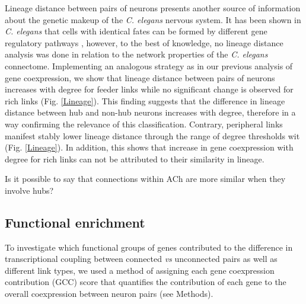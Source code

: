 \documentclass[10pt,letterpaper]{article}
\begin{document}
\begin{figure}[!h]
{%
}
 \label{fig:modules}
\end{figure}


Lineage distance between pairs of neurons presents another source of information about the genetic makeup of the \textit{C. elegans} nervous system.
It has been shown in \textit{C. elegans} that cells with identical fates can be formed by different gene regulatory pathways \citep{Liu2009}, however, to the best of knowledge, no lineage distance analysis was done in relation to the network properties of the \textit{C. elegans} connectome.
Implementing an analogous strategy as in our previous analysis of gene coexpression, we show that lineage distance between pairs of neurons increases with degree for feeder links while no significant change is observed for rich links (Fig. \ref{Lineage}).
This finding suggests that the difference in lineage distance between hub and non-hub neurons increases with degree, therefore in a way confirming the relevance of this classification.
Contrary, peripheral links manifest stably lower lineage distance through the range of degree thresholds wit (Fig. \ref{Lineage}).
In addition, this shows that increase in gene coexpression with degree for rich links can not be attributed to their similarity in lineage.

Is it possible to say that connections within ACh are more similar when they involve hubs?

\subsection*{Functional enrichment}


To investigate which functional groups of genes contributed to the difference in transcriptional coupling between connected \textit{vs} unconnected pairs as well as different link types, we used a method of assigning each gene coexpression contribution (GCC) score that quantifies the contribution of each gene to the overall coexpression between neuron pairs (see Methods).  \\
\end{document}

